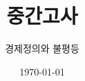 \documentclass{article}
\begin{document}

\title{중간고사} %
\author{경제정의와 불평등} %
\date{\today}

\maketitle

%
\end{document}
